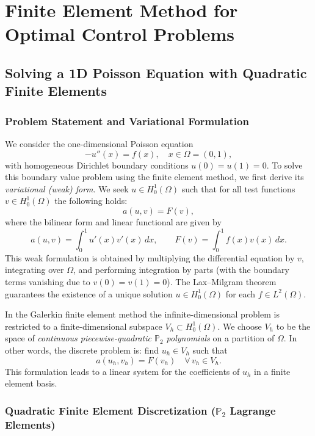 \documentclass[a4paper,10pt]{report}
\begin{document}

\clearpage

\chapter{Finite Element Method for Optimal Control Problems}

\section{Solving a 1D Poisson Equation with Quadratic Finite Elements}

\subsection{Problem Statement and Variational Formulation}

We consider the one-dimensional Poisson equation
\[
	-u''(x)=f(x), \quad x\in\Omega=(0,1),
\]
with homogeneous Dirichlet boundary conditions \(u(0)=u(1)=0\).
To solve this boundary value problem using the finite element method, we first derive its \emph{variational (weak) form}. We seek \(u\in H_0^1(\Omega)\) such that for all test functions \(v\in H_0^1(\Omega)\) the following holds:
\[
	a(u,v)=F(v),
\]
where the bilinear form and linear functional are given by
\[
	a(u,v)=\int_0^1 u'(x)v'(x)\,dx,\qquad F(v)=\int_0^1 f(x)v(x)\,dx.
\]
This weak formulation is obtained by multiplying the differential equation by \(v\), integrating over \(\Omega\), and performing integration by parts (with the boundary terms vanishing due to \(v(0)=v(1)=0\)). The Lax--Milgram theorem guarantees the existence of a unique solution \(u\in H_0^1(\Omega)\) for each \(f\in L^2(\Omega)\).

In the Galerkin finite element method the infinite-dimensional problem is restricted to a finite-dimensional subspace \(V_h\subset H_0^1(\Omega)\). We choose \(V_h\) to be the space of \emph{continuous piecewise-quadratic \(\mathbb{P}_2\) polynomials} on a partition of \(\Omega\). In other words, the discrete problem is: find \(u_h\in V_h\) such that
\[
	a(u_h,v_h)=F(v_h)\quad\forall\, v_h\in V_h.
\]
This formulation leads to a linear system for the coefficients of \(u_h\) in a finite element basis.

\subsection{Quadratic Finite Element Discretization (\(\mathbb{P}_2\) Lagrange Elements)}
\end{document}
